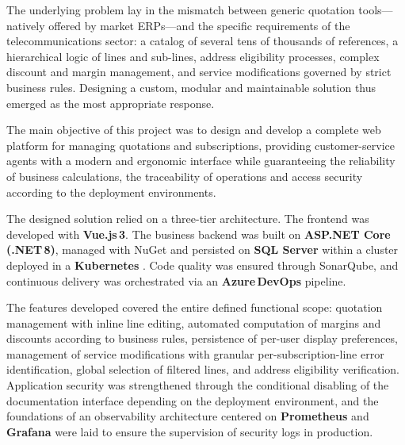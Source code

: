 \vspace{0.2cm}

The underlying problem lay in the mismatch between generic quotation tools---natively offered by market ERPs---and the specific requirements of the telecommunications sector: a catalog of several tens of thousands of references, a hierarchical logic of lines and sub-lines, address eligibility processes, complex discount and margin management, and service modifications governed by strict business rules. Designing a custom, modular and maintainable solution thus emerged as the most appropriate response.

\vspace{0.2cm}

The main objective of this project was to design and develop a complete web platform for managing quotations and subscriptions, providing customer-service agents with a modern and ergonomic interface while guaranteeing the reliability of business calculations, the traceability of operations and access security according to the deployment environments.

\vspace{0.2cm}

The designed solution relied on a three-tier architecture. The frontend was developed with \textbf{Vue.js\,3}. The business backend was built on \textbf{ASP.NET Core (.NET\,8)}, managed with NuGet and persisted on \textbf{SQL Server} within a cluster deployed in a \textbf{Kubernetes} . Code quality was ensured through SonarQube, and continuous delivery was orchestrated via an \textbf{Azure\,DevOps} pipeline.

\vspace{0.2cm}

The features developed covered the entire defined functional scope: quotation management with inline line editing, automated computation of margins and discounts according to business rules, persistence of per-user display preferences, management of service modifications with granular per-subscription-line error identification, global selection of filtered lines, and address eligibility verification. Application security was strengthened through the conditional disabling of the documentation interface depending on the deployment environment, and the foundations of an observability architecture centered on \textbf{Prometheus} and \textbf{Grafana} were laid to ensure the supervision of security logs in production.

\vspace{0.3cm}

\clearpage